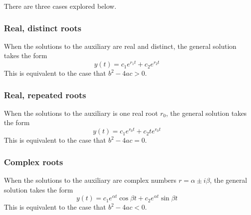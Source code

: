 There are three cases explored below.

\subsubsection{Real, distinct roots}
When the solutions to the auxiliary are real and distinct, the general solution takes the form
\begin{equation}
    y(t) = c_1 e^{r_1 t} + c_2 e^{r_2 t}
\end{equation}
This is equivalent to the case that $b^2-4ac>0$.

\subsubsection{Real, repeated roots}
When the solutions to the auxiliary is one real root $r_0$, the general solution takes the form
\begin{equation}
    y(t) = c_1 e^{r_0 t} + c_2 t e^{r_0 t}
\end{equation}
This is equivalent to the case that $b^2-4ac=0$.

\subsubsection{Complex roots}
When the solutions to the auxiliary are complex numbers $r=\alpha \pm i \beta$, the general solution takes the form
\begin{equation}
    y(t) = c_1 e^{\alpha t} \cos{\beta t} + c_2 e^{\alpha t} \sin{\beta t} 
\end{equation}
This is equivalent to the case that $b^2-4ac<0$.
